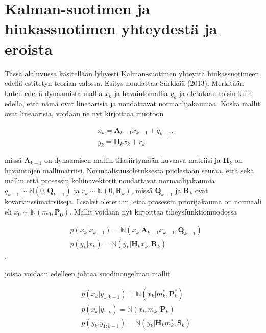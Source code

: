 \documentclass[
  12pt,
  a4paper, twoside]{book}
\begin{document}
\section{Kalman-suotimen ja hiukassuotimen yhteydestä ja eroista} \label{kf-yhteydet-erot}

Tässä alaluvussa käsitellään lyhyesti Kalman-suotimen yhteyttä hiukassuotimeen edellä estitetyn teorian valossa. Esitys noudattaa Särkkää (2013). \citep{sarkka-2013} Merkitään kuten edellä dynaamista mallia \(x_k\) ja havaintomallia \(y_k\) ja oletataan toisin kuin edellä, että nämä ovat lineaarisia ja noudattavat normaalijakaumaa. Koska mallit ovat lineaarisia, voidaan ne nyt kirjoittaa muotoon

\begin{align}
&\label{kalman-malli1}x_k=\mathbf{A}_{k-1}x_{k-1}+q_{k-1},\\
&\label{kalman-malli2}y_k=\mathbf{H}_k x_k + r_k
\end{align}

missä \(\mathbf{A}_{k-1}\) on dynaamisen mallin tilasiirtymään kuvaava matriisi ja \(\mathbf{H}_k\) on havaintojen mallimatriisi. Normaalisuusoletuksesta puolestaan seuraa, että sekä mallin että prosessin kohinavektorit noudattavat normaalijakaumia \(q_{k-1} \sim \mathbb{N}(0, \mathbf{Q}_{k-1})\) ja \(r_k \sim \mathbb{N}(0, \mathbf{R}_k)\), missä \(\mathbf{Q}_{k-1}\) ja \(\mathbf{R}_k\) ovat kovarianssimatrsiiseja. Lisäksi oletetaan, että prosessin priorijakauma on normaali eli \(x_0 \sim \mathbb{N}(m_0, \mathbf{P_0})\). Mallit voidaan nyt kirjoittaa tiheysfunktiomuodossa

\begin{align}
&\label{kalman-malli-pdf1}p(x_k|x_{k-1})=\mathbb{N}(x_k|\mathbf{A}_{k-1}x_{k-1},\mathbf{Q}_{k-1})\\
&\label{kalman-malli-pdf2}p(y_k|x_k)=\mathbb{N}(y_k|\mathbf{H}_{k}x_{k},\mathbf{R}_{k})
\end{align},

joista voidaan edelleen johtaa suodinongelman mallit

\begin{align}
&\label{kalman-malli-suodin1}p(x_k|y_{1:k-1})=\mathbb{N}(x_k|m_k^* ,\mathbf{P}_k^*)\\
&\label{kalman-malli-suodin2}p(x_k|y_{1:k})=\mathbb{N}(x_k|m_k ,\mathbf{P}_k)\\
&\label{kalman-malli-suodin3}p(y_k|y_{1:k-1})=\mathbb{N}(y_k|\mathbf{H}_k m_k^* ,\mathbf{S}_k)
\end{align}
\end{document}
